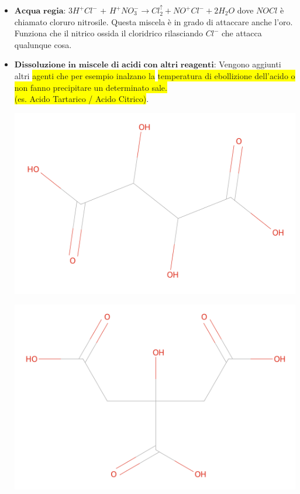 \documentclass{article}
\begin{document}
\begin{itemize}
	\item {$\mathbf{Acqua}$ $\mathbf{regia}$:} $3H^+Cl^-$ + $H^+NO_3^- \longrightarrow Cl_2^{\uparrow} + NO^+Cl^- + 2H_2O$ dove $NOCl$ è chiamato cloruro nitrosile. Questa miscela è in grado di attaccare anche l'oro. Funziona che il nitrico ossida il cloridrico rilasciando $Cl^-$ che attacca qualunque cosa.
	\item {$\mathbf{Dissoluzione}$ $\mathbf{in}$ $\mathbf{miscele}$ $\mathbf{di}$ $\mathbf{acidi}$ $\mathbf{con}$ $\mathbf{altri}$ $\mathbf{reagenti}$:} Vengono aggiunti altri \colorbox{yellow}{agenti che per esempio inalzano la} \colorbox{yellow}{temperatura di ebollizione dell'acido o non fanno precipitare un determinato sale.} \\\colorbox{yellow}{(es. Acido Tartarico / Acido Citrico)}.
	\begin{center}
		\begin{minipage}{0.4\textwidth}
			\includegraphics*[width=0.9\linewidth]{../images/tartarico.png}
		\end{minipage}
		\begin{minipage}{0.4\textwidth}
			\includegraphics*[width=0.9\linewidth]{../images/citrico.png}

\end{minipage}
\end{center}
\end{itemize}
\end{document}
